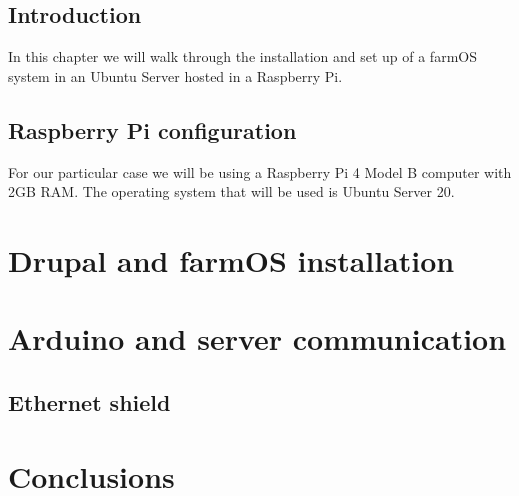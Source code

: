 \subsection{Introduction}
In this chapter we will walk through the installation and set up of a farmOS system in an Ubuntu Server hosted in a Raspberry Pi.


\subsection{Raspberry Pi configuration}
For our particular case we will be using a Raspberry Pi 4 Model B computer with 2GB RAM. The operating system that will be used is Ubuntu Server 20.
\section{Drupal and farmOS installation}


\section{Arduino and server communication}

\subsection{Ethernet shield}

\section{Conclusions}


